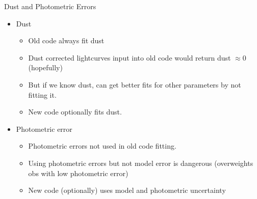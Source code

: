 \documentclass[12pt]{beamer}
\begin{document}


  


\begin{frame}{Dust and Photometric Errors}
  \begin{itemize}
    \item Dust
  \begin{itemize}
  \item Old code always fit dust
  \item Dust corrected lightcurves input into old code would return dust $\approx 0$ (hopefully)
  \item But if we know dust, can get better fits for other parameters by not fitting it.
  \item New code optionally fits dust.
  \end{itemize}
\item Photometric error
  \begin{itemize}
  \item Photometric errors not used in old code fitting.
  \item Using photometric errors but not model error is dangerous (overweights obs with low photometric error)
  \item New code (optionally) uses model and photometric uncertainty
  \end{itemize}
  \end{itemize}
  \end{frame}
\end{document}
